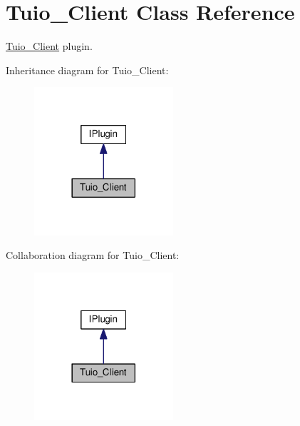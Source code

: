 \hypertarget{class_tuio___client}{}\section{Tuio\+\_\+\+Client Class Reference}
\label{class_tuio___client}


\hyperlink{class_tuio___client}{Tuio\+\_\+\+Client} plugin.  




Inheritance diagram for Tuio\+\_\+\+Client\+:\nopagebreak
\begin{figure}[H]
\begin{center}
\leavevmode
\includegraphics[width=146pt]{class_tuio___client__inherit__graph}
\end{center}
\end{figure}


Collaboration diagram for Tuio\+\_\+\+Client\+:\nopagebreak
\begin{figure}[H]
\begin{center}
\leavevmode
\includegraphics[width=146pt]{class_tuio___client__coll__graph}
\end{center}
\end{figure}
